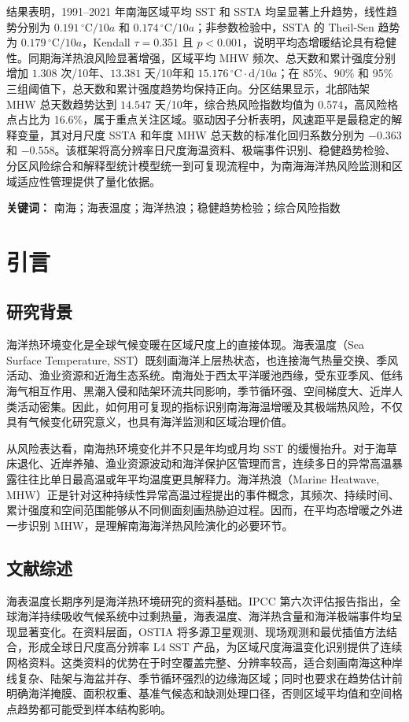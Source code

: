 \documentclass[UTF8,a4paper,zihao=-4,fontset=fandol]{ctexart}
\begin{document}
结果表明，1991--2021 年南海区域平均 SST 和 SSTA 均呈显著上升趋势，线性趋势分别为 $0.191\,^{\circ}\mathrm{C}/10a$ 和 $0.174\,^{\circ}\mathrm{C}/10a$；非参数检验中，SSTA 的 Theil-Sen 趋势为 $0.179\,^{\circ}\mathrm{C}/10a$，Kendall $\tau=0.351$ 且 $p<0.001$，说明平均态增暖结论具有稳健性。同期海洋热浪风险显著增强，区域平均 MHW 频次、总天数和累计强度分别增加 $1.308$ 次/10年、$13.381$ 天/10年和 $15.176\,^{\circ}\mathrm{C}\cdot\mathrm{d}/10a$；在 85\%、90\% 和 95\% 三组阈值下，总天数和累计强度趋势均保持正向。分区结果显示，北部陆架 MHW 总天数趋势达到 $14.547$ 天/10年，综合热风险指数均值为 0.574，高风险格点占比为 16.6\%，属于重点关注区域。驱动因子分析表明，风速距平是最稳定的解释变量，其对月尺度 SSTA 和年度 MHW 总天数的标准化回归系数分别为 $-0.363$ 和 $-0.558$。该框架将高分辨率日尺度海温资料、极端事件识别、稳健趋势检验、分区风险综合和解释型统计模型统一到可复现流程中，为南海海洋热风险监测和区域适应性管理提供了量化依据。

\noindent\textbf{关键词：} 南海；海表温度；海洋热浪；稳健趋势检验；综合风险指数

\newpage
\tableofcontents
\newpage
\listoftables
\listoffigures
\newpage

\section{引言}

\subsection{研究背景}
海洋热环境变化是全球气候变暖在区域尺度上的直接体现。海表温度（Sea Surface Temperature, SST）既刻画海洋上层热状态，也连接海气热量交换、季风活动、渔业资源和近海生态系统。南海处于西太平洋暖池西缘，受东亚季风、低纬海气相互作用、黑潮入侵和陆架环流共同影响，季节循环强、空间梯度大、近岸人类活动密集。因此，如何用可复现的指标识别南海海温增暖及其极端热风险，不仅具有气候变化研究意义，也具有海洋监测和区域治理价值。

从风险表达看，南海热环境变化并不只是年均或月均 SST 的缓慢抬升。对于海草床退化、近岸养殖、渔业资源波动和海洋保护区管理而言，连续多日的异常高温暴露往往比单日最高温或年平均温度更具解释力。海洋热浪（Marine Heatwave, MHW）正是针对这种持续性异常高温过程提出的事件概念，其频次、持续时间、累计强度和空间范围能够从不同侧面刻画热胁迫过程。因而，在平均态增暖之外进一步识别 MHW，是理解南海海洋热风险演化的必要环节。

\subsection{文献综述}
海表温度长期序列是海洋热环境研究的资料基础。IPCC 第六次评估报告指出，全球海洋持续吸收气候系统中过剩热量，海表温度、海洋热含量和海洋极端事件均呈现显著变化\cite{ipcc2021}。在资料层面，OSTIA 将多源卫星观测、现场观测和最优插值方法结合，形成全球日尺度高分辨率 L4 SST 产品，为区域尺度海温变化识别提供了连续网格资料\cite{donlon2012ostia,copernicus2026ostia}。这类资料的优势在于时空覆盖完整、分辨率较高，适合刻画南海这种岸线复杂、陆架与海盆并存、季节循环强烈的边缘海区域；同时也要求在趋势估计前明确海洋掩膜、面积权重、基准气候态和缺测处理口径，否则区域平均值和空间格点趋势都可能受到样本结构影响。
\end{document}

